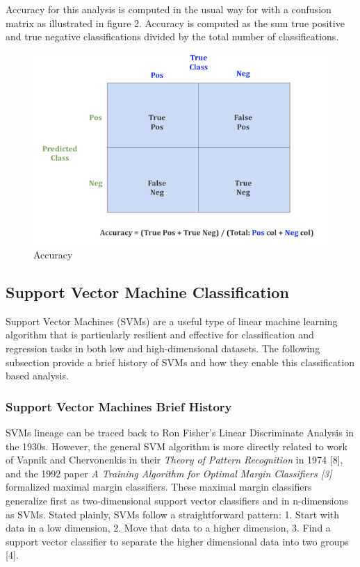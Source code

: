 \documentclass[
]{article}
\begin{document}
Accuracy for this analysis is computed in the usual way for with a
confusion matrix as illustrated in figure 2. Accuracy is computed as the
sum true positive and true negative classifications divided by the total
number of classifications.

\begin{figure}[H]
\includegraphics[width=0.5\linewidth]{./notebooks/R_Notebooks/images/Accuracy} \caption{Accuracy}\label{fig:accuracy}
\end{figure}

\subsection{Support Vector Machine
Classification}\label{support-vector-machine-classification}

Support Vector Machines (SVMs) are a useful type of linear machine
learning algorithm that is particularly resilient and effective for
classification and regression tasks in both low and high-dimensional
datasets. The following subsection provide a brief history of SVMs and
how they enable this classification based analysis.

\subsubsection{Support Vector Machines Brief
History}\label{support-vector-machines-brief-history}

SVMs lineage can be traced back to Ron Fisher's Linear Discriminate
Analysis in the 1930s. However, the general SVM algorithm is more
directly related to work of Vapnik and Chervonenkis in their
\emph{Theory of Pattern Recognition} in 1974 {[}8{]}, and the 1992 paper
\emph{A Training Algorithm for Optimal Margin Classifiers {[}3{]}}
formalized maximal margin classifiers. These maximal margin classifiers
generalize first as two-dimensional support vector classifiers and in
n-dimensions as SVMs. Stated plainly, SVMs follow a straightforward
pattern: 1. Start with data in a low dimension, 2. Move that data to a
higher dimension, 3. Find a support vector classifier to separate the
higher dimensional data into two groups {[}4{]}.
\end{document}
